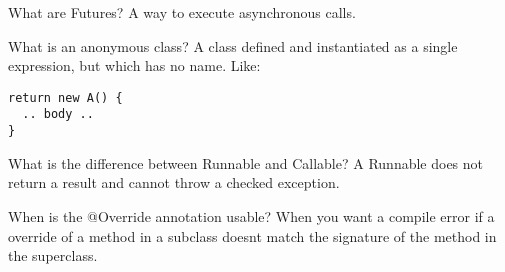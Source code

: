 \documentclass[avery5371,grid]{flashcards}
\begin{document}
\begin{flashcard}[Concurrency]{What are Futures?}
A way to execute asynchronous calls.
\end{flashcard}

\begin{flashcard}[Lang]{What is an anonymous class?}
A class defined and instantiated as a single expression, but which has no name. Like:
\begin{lstlisting}[frame=single]
return new A() {
  .. body ..
}
\end{lstlisting}
\end{flashcard}

\begin{flashcard}[Concurrency]{What is the difference between Runnable and Callable?}
A Runnable does not return a result and cannot throw a checked exception.
\end{flashcard}

\begin{flashcard}[Lang]{When is the @Override annotation usable?}
When you want a compile error if a override of a method in a subclass doesnt match the signature of the method in the superclass.
\end{flashcard}
\end{document}
